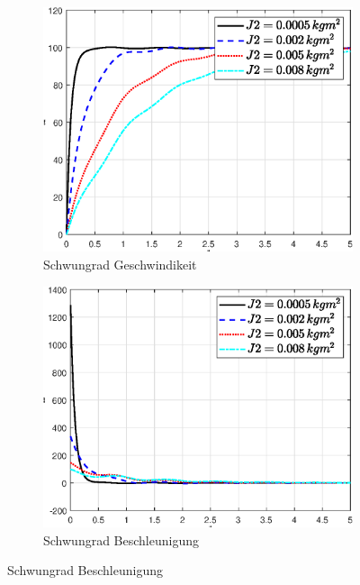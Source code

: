 \begin{figure}
    \captionsetup[subfigure]{justification=centering,font=footnotesize}
    \begin{subfigure}[b]{0.49\linewidth}
        \includegraphics[width=\linewidth]{Bilder/5_sensi/fig/j2/phi_punkt.eps}
        \caption{Schwungrad Geschwindikeit}
        \label{fig:j2_phi_punkt}
    \end{subfigure}
    \begin{subfigure}[b]{0.49 \linewidth}
        \includegraphics[width=\linewidth]{Bilder/5_sensi/fig/j2/phi_punkt_punkt.eps}
        \caption{Schwungrad Beschleunigung}
        \label{fig:j2_phi_punkt_punkt}

\end{subfigure}
\end{figure}
